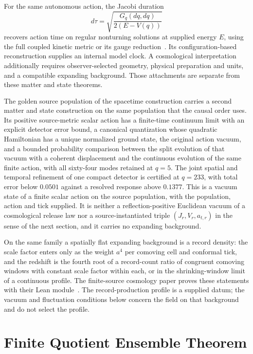 \documentclass[11pt]{article}
\theoremstyle{remark}
\theoremstyle{plain}
\begin{document}
For the same autonomous action, the Jacobi duration
\[
 d\tau=\sqrt{\frac{G_q(dq,dq)}{2(E-V(q))}}
\]
recovers action time on regular nonturning solutions at supplied energy
\(E\), using the full coupled kinetic metric or its gauge
reduction~\cite{ophobservers}. Its
configuration-based reconstruction supplies an internal model clock.
A cosmological interpretation additionally requires observer-selected
geometry, physical preparation and units, and a compatible expanding
background. Those attachments are separate from these matter and state
theorems.

The golden source population of the spacetime construction carries a second
matter and state construction on the same population that the causal order
uses. Its positive source-metric scalar action has a finite-time continuum
limit with an explicit detector error bound, a canonical quantization whose
quadratic Hamiltonian has a unique normalized ground state, the original
action vacuum, and a bounded probability comparison between the split
evolution of that vacuum with a coherent displacement and the continuous
evolution of the same finite action, with all sixty-four modes retained at
\(q=5\). The joint spatial and temporal refinement of one compact detector is
certified at \(q=233\), with total error below \(0.0501\) against a resolved
response above \(0.1377\). This is a vacuum state of a finite scalar action on
the source population, with the population, action and tick supplied. It is
neither a reflection-positive Euclidean vacuum of a cosmological release law
nor a source-instantiated triple \((J_r,V_r,a_{t,r})\) in the sense of the
next section, and it carries no expanding background.

On the same family a spatially flat expanding background is a record
density: the scale factor enters only as the weight \(a^4\) per comoving
cell and conformal tick, and the redshift is the fourth root of a
record-count ratio of congruent comoving windows with constant scale factor
within each, or in the shrinking-window limit of a continuous profile. The
finite-source
cosmology paper proves these statements with their Lean
module~\cite{ophcmb}. The record-production profile is a supplied datum; the
vacuum and fluctuation conditions below concern the field on that background
and do not select the profile.

\section{Finite Quotient Ensemble Theorem}
\end{document}
